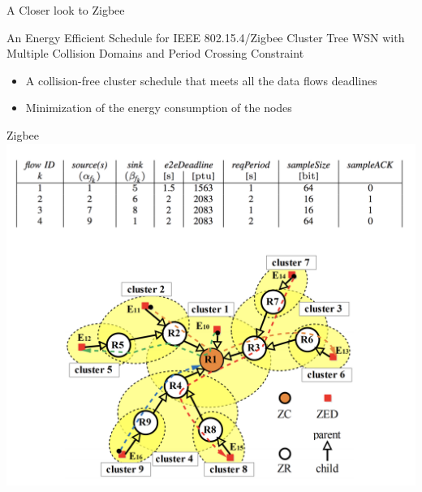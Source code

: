 \documentclass[serif,Blue]{beamer}
\begin{document}
\begin{frame}{A Closer look to Zigbee}
	\begin{block}{An Energy Efficient Schedule for IEEE 802.15.4/Zigbee Cluster Tree WSN with Multiple Collision Domains and Period Crossing Constraint}
		\begin{itemize}\justifying{}
			\item A collision-free cluster schedule that meets all the data flows deadlines
			\item Minimization of the energy consumption of the nodes
		\end{itemize}
	\end{block}
\end{frame}

\begin{frame}{Zigbee}
	\center\includegraphics[scale=.2]{img/cluster-flow.png}
\end{frame}
\end{document}
